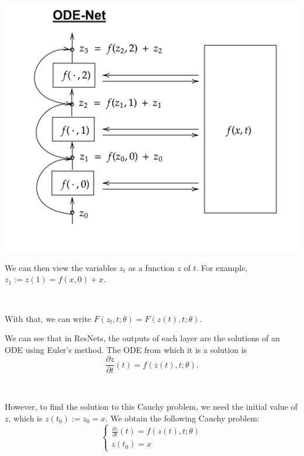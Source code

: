 \documentclass[11pt]{beamer}
\begin{document}
\begin{frame}
\begin{center}
\includegraphics[scale=0.12]{ODENet.png}
\end{center}

We can then view the variables $z_t$ as a function $z$ of $t$. For example,
$
z_1 := z(1) = f(x, 0) + x.
$

~

With that, we can write $F(z_t, t; \theta) = F(z(t), t; \theta)$.
\end{frame}

\begin{frame}
We can see that in ResNets, the outputs of each layer are the solutions of an ODE using Euler's method. The ODE from which it is a solution is $$\frac{\partial z}{\partial t}(t) = f(z(t),t;\theta).$$

~

However, to find the solution to this Cauchy problem, we need the initial value of $z$, which is $z(t_0):=  z_0 = x$. We obtain the following Cauchy problem:
\begin{equation}
\label{cauchypb}
\begin{cases}
\frac{\partial z}{\partial t}(t) =  f(z(t), t; \theta) \\
z(t_0) =  x
\end{cases}
\end{equation}

\end{frame}
\end{document}
